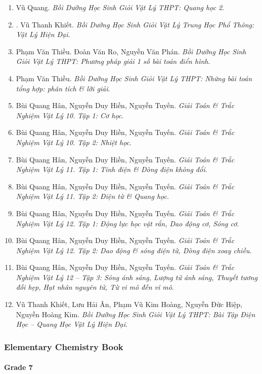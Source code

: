\documentclass{article}
\begin{document}
\begin{enumerate}
	\item Vũ Quang. {\it Bồi Dưỡng Học Sinh Giỏi Vật Lý THPT: Quang học 2}.
	\item \cite{Khiet_Vat_Ly_hien_dai}. Vũ Thanh Khiết. {\it Bồi Dưỡng Học Sinh Giỏi Vật Lý Trung Học Phổ Thông: Vật Lý Hiện Đại}.\hfill{\sf[reading]}
	\item Phạm Văn Thiều. Đoàn Văn Ro, Nguyễn Văn Phán. {\it Bồi Dưỡng Học Sinh Giỏi Vật Lý THPT: Phương pháp giải 1 số bài toán điển hình}.
	\item Phạm Văn Thiều. {\it Bồi Dưỡng Học Sinh Giỏi Vật Lý THPT: Những bài toán tổng hợp: phân tích \& lời giải}.
	\item Bùi Quang Hân, Nguyễn Duy Hiền, Nguyễn Tuyến. {\it Giải Toán \& Trắc Nghiệm Vật Lý 10. Tập 1: Cơ học}.
	\item Bùi Quang Hân, Nguyễn Duy Hiền, Nguyễn Tuyến. {\it Giải Toán \& Trắc Nghiệm Vật Lý 10. Tập 2: Nhiệt học}.
	\item Bùi Quang Hân, Nguyễn Duy Hiền, Nguyễn Tuyến. {\it Giải Toán \& Trắc Nghiệm Vật Lý 11. Tập 1: Tĩnh điện \& Dòng điện không đổi}.
	\item Bùi Quang Hân, Nguyễn Duy Hiền, Nguyễn Tuyến. {\it Giải Toán \& Trắc Nghiệm Vật Lý 11. Tập 2: Điện từ \& Quang học}.
	\item Bùi Quang Hân, Nguyễn Duy Hiền, Nguyễn Tuyến. {\it Giải Toán \& Trắc Nghiệm Vật Lý 12. Tập 1: Động lực học vật rắn, Dao động cơ, Sóng cơ}.
	\item Bùi Quang Hân, Nguyễn Duy Hiền, Nguyễn Tuyến. {\it Giải Toán \& Trắc Nghiệm Vật Lý 12. Tập 2: Dao động \& sóng điện từ, Dòng điện xoay chiều}.
	\item Bùi Quang Hân, Nguyễn Duy Hiền, Nguyễn Tuyến. {\it Giải Toán \& Trắc Nghiệm Vật Lý 12 -- Tập 3: Sóng ánh sáng, Lượng tử ánh sáng, Thuyết tương đối hẹp, Hạt nhân nguyên tử, Từ vi mô đến vĩ mô}.
	\item Vũ Thanh Khiết, Lưu Hải Ân, Phạm Vũ Kim Hoàng, Nguyễn Đức Hiệp, Nguyễn Hoàng Kim. {\it Bồi Dưỡng Học Sinh Giỏi Vật Lý THPT: Bài Tập Điện Học -- Quang Học Vật Lý Hiện Đại}.
\end{enumerate}

\subsubsection{Elementary Chemistry Book}

\paragraph{Grade 7}
\end{document}
